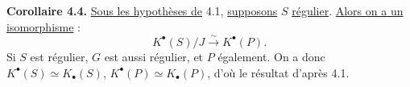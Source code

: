 
\textbf{Corollaire 4.4.} \uline{Sous les hypothèses de} 4.1, \uline{supposons} $S$ \uline{régulier}. \uline{Alors on a un isomorphisme} :
\[
K^{\bullet}(S)/J\xrightarrow{\sim}K^{\bullet}(P).
\]
Si $S$ est régulier, $G$ est aussi régulier, et $P$ également. On a donc $K^{\bullet}(S)\simeq K_\bullet(S)$, $K^{\bullet}(P)\simeq K_\bullet(P)$, d'où le résultat d'après 4.1.



\providecommand{\Filt}{\operatorname{Filt}}
\providecommand{\Coh}{\operatorname{Coh}}
\renewcommand{\Ob}{\operatorname{Ob}}
\providecommand{\longg}{\operatorname{long}}
\providecommand{\degtr}{\operatorname{deg.tr}}
\providecommand{\dimdot}{\operatorname{dim.}}
\providecommand{\Frac}{\operatorname{Frac}}
\providecommand{\fpqc}{\mathrm{fpqc}}
\providecommand{\Sch}{\operatorname{Sch}}
\providecommand{\Picf}{\operatorname{Pic}}
\providecommand{\Ens}{\operatorname{Ens}}
\providecommand{\im}{\operatorname{Im}}

